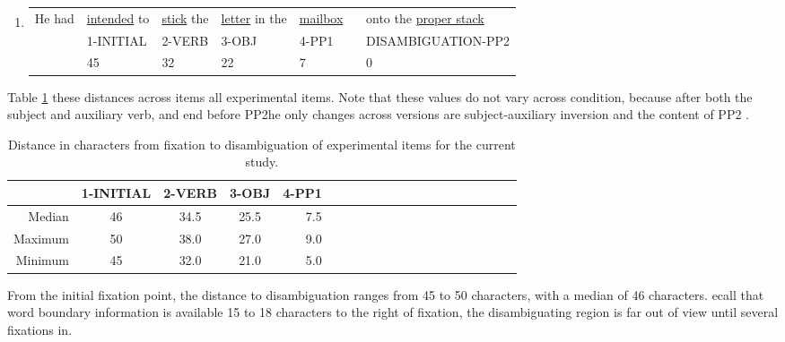 \documentclass[12pt,oneside]{book}
\begin{document}
\begin{enumerate}
\def\labelenumi{(\arabic{enumi})}
\setcounter{enumi}{34}
\item
  \begingroup
    \setlength{\tabcolsep}{1pt}
    \begin{tabular}{lllll|l}
  He had & 
  \underline{intended} to & 
  \underline{stick} the & 
  \underline{letter} in the & 
  \underline{mailbox} \  & onto the \underline{proper stack} \\
  & \footnotesize 1-INITIAL & \footnotesize 2-VERB & \footnotesize 3-OBJ & \footnotesize 4-PP1 & \footnotesize DISAMBIGUATION-PP2 \\
  & 45 & 32 & 22 & 7 & 0
  \end{tabular}
  \endgroup
\end{enumerate}

Table \ref{tab:dtcs}  these distances  across items all experimental items. Note that these values do not vary across condition, because  after both the subject and auxiliary verb, and  end before PP2he only changes across versions are subject-auxiliary inversion and the content of PP2 .

\begin{table}[!h]

\caption{\label{tab:dtcs}Distance in characters from fixation to disambiguation of experimental items for the current study.}
\centering
\begin{tabular}{rcccrcccrcccrcccrccc}
\toprule
  & 1-INITIAL & 2-VERB & 3-OBJ & 4-PP1\\
\midrule
Median & 46 & 34.5 & 25.5 & 7.5\\
Maximum & 50 & 38.0 & 27.0 & 9.0\\
Minimum & 45 & 32.0 & 21.0 & 5.0\\
\bottomrule
\end{tabular}
\end{table}

From the initial fixation point, the distance to disambiguation ranges from 45 to 50 characters, with a median of 46 characters. ecall that word boundary information is available  15 to 18 characters to the right of fixation,  the disambiguating region is far out of view until several fixations in.
\end{document}
